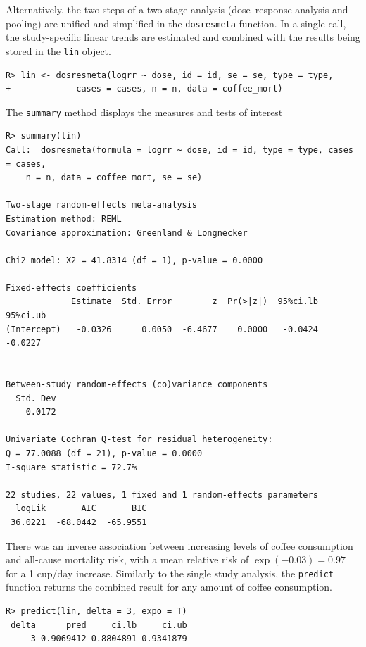 \documentclass[11pt,a4paper,twoside,openany]{book}\usepackage{knitr}
\begin{document}
{{\noindent Alternatively, the two steps of a two-stage analysis (dose--response analysis and pooling) are unified and simplified in the \texttt{dosresmeta} function. In a single call, the study-specific linear trends are estimated and combined with the results being stored in the \texttt{lin} object. 
\begin{knitrout}\footnotesize
{}\color{fgcolor}\begin{kframe}
\begin{verbatim}
R> lin <- dosresmeta(logrr ~ dose, id = id, se = se, type = type,
+             cases = cases, n = n, data = coffee_mort)
\end{verbatim}
\end{kframe}
\end{knitrout}

\noindent The \texttt{summary} method displays the measures and tests of interest
\begin{knitrout}\footnotesize
{}\color{fgcolor}\begin{kframe}
\begin{verbatim}
R> summary(lin)
Call:  dosresmeta(formula = logrr ~ dose, id = id, type = type, cases = cases, 
    n = n, data = coffee_mort, se = se)

Two-stage random-effects meta-analysis
Estimation method: REML
Covariance approximation: Greenland & Longnecker

Chi2 model: X2 = 41.8314 (df = 1), p-value = 0.0000

Fixed-effects coefficients
             Estimate  Std. Error        z  Pr(>|z|)  95%ci.lb  95%ci.ub
(Intercept)   -0.0326      0.0050  -6.4677    0.0000   -0.0424   -0.0227


Between-study random-effects (co)variance components
  Std. Dev
    0.0172

Univariate Cochran Q-test for residual heterogeneity:
Q = 77.0088 (df = 21), p-value = 0.0000
I-square statistic = 72.7%

22 studies, 22 values, 1 fixed and 1 random-effects parameters
  logLik       AIC       BIC  
 36.0221  -68.0442  -65.9551  
\end{verbatim}
\end{kframe}
\end{knitrout}

\noindent There was an inverse association between increasing levels of coffee consumption and all-cause mortality risk, with a mean relative risk of $\exp(-0.03) = 0.97$ for a 1 cup/day increase. Similarly to the single study analysis, the \texttt{predict} function returns the combined result for any amount of coffee consumption.
\begin{knitrout}\footnotesize
{}\color{fgcolor}\begin{kframe}
\begin{verbatim}
R> predict(lin, delta = 3, expo = T)
 delta      pred     ci.lb     ci.ub
     3 0.9069412 0.8804891 0.9341879
\end{verbatim}
\end{kframe}
\end{knitrout}

}}
\end{document}
